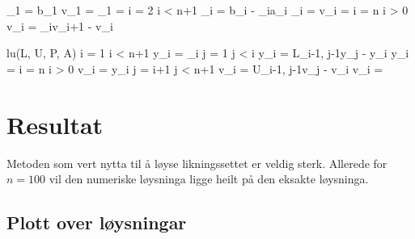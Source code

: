 \documentclass[11pt, a4paper]{article}
\begin{document}
    \begin{program}
      \lambda_1 = b_1
      v_1 = 
      \gamma_1 = 
      \FOR i = 2 \TO i < n+1 
        \lambda_i = b_i - \gamma_ia_i
        \gamma_i = 
        v_i = 
        \OD
      \FOR i = n \TO i > 0 
      v_i = \gamma_iv_{i+1} - v_i
      \OD
    \end{program}
    \begin{program}
      lu(L, U, P, A) 
      \FOR i = 1 \TO i < n+1 
      y_i = _i
      \FOR j = 1 \TO j < i 
        y_i = L_{i-1, j-1}y_j - y_i
        \OD
      y_i = 
      \OD
      \FOR i = n \TO i > 0 
        v_i = y_i
        \FOR j = i+1 \TO j < n+1 
          v_i = U_{i-1, j-1}v_j - v_i
          \OD
        v_i = 
        \OD
    \end{program}

    

\newpage

\section{Resultat}
  Metoden som vert nytta til å løyse likningssettet er veldig sterk. Allerede for $n = 100$ vil 
  den numeriske løysninga ligge heilt på den eksakte løysninga. 

  \subsection{Plott over løysningar}
\end{document}
